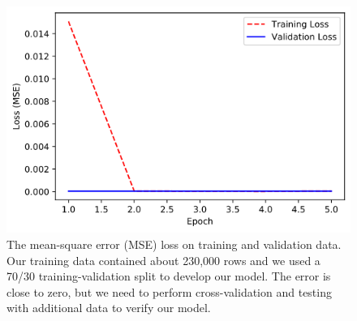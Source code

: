\documentclass[conference]{IEEEtran}
\begin{document}
\begin{figure}[ht]
    \includegraphics[width=\linewidth]{img/loss.png}
    \caption{The mean-square error (MSE) loss on training and validation data. Our training data contained about 230,000 rows and we used a 70/30 training-validation split to develop our model. The error is close to zero, but we need to perform cross-validation and testing with additional data to verify our model.}
    \label{fig:model_loss}
\end{figure}
\end{document}
